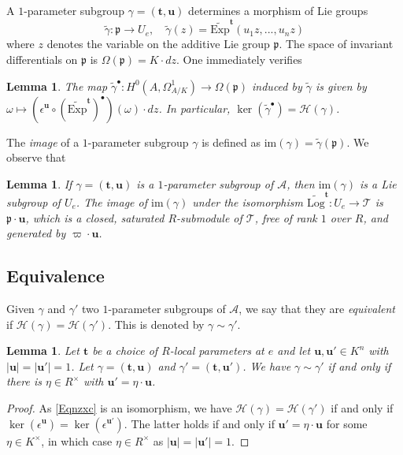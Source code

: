 \documentclass[11pt]{amsart}
\newtheorem{lemma}[theorem]{Lemma}
\theoremstyle{remark}
\numberwithin{equation}{section}
\newcommand{\pfrak}{\mathfrak{p}}
\newcommand{\Acal}{\mathscr{A}}
\newcommand{\Hcal}{\mathscr{H}}
\newcommand{\Tcal}{\mathscr{T}}
\newcommand{\ttt}{\mathbf{t}}
\newcommand{\uu}{\mathbf{u}}
\newcommand{\Exp}{\mathrm{Exp}}
\newcommand{\Log}{\mathrm{Log}}
\newcommand{\im}{\mathrm{im}}
\begin{document}
A $1$-parameter subgroup $\gamma=(\ttt,\uu)$ determines a morphism of Lie groups 
\begin{equation}\label{Eqntildegamma}
\tilde{\gamma}:\pfrak \to U_e, \quad \tilde{\gamma}(z)=\widetilde{\Exp}^\ttt(u_1z,...,u_nz)
\end{equation}
where $z$ denotes the variable on the additive Lie group $\pfrak$. The space of invariant differentials on $\pfrak$ is $\Omega(\pfrak) = K\cdot dz$. One immediately verifies
\begin{lemma}\label{LemmaHisKernel} The map $\tilde{\gamma}^\bullet : H^0(A,\Omega^1_{A/K})\to \Omega(\pfrak)$ induced by $\tilde{\gamma}$  is given by $\omega\mapsto (\epsilon^\uu\circ (\widetilde{\Exp}^\ttt)^\bullet)(\omega)\cdot dz$. In particular, $\ker(\tilde{\gamma}^\bullet)=\Hcal(\gamma)$.
\end{lemma}
The \emph{image} of a $1$-parameter subgroup $\gamma$ is defined as $\im(\gamma)=\tilde{\gamma}(\pfrak)$. We observe that
\begin{lemma}\label{LemmaSaturated} If $\gamma=(\ttt,\uu)$ is a $1$-parameter subgroup of $\Acal$, then $\im(\gamma)$ is a Lie subgroup of $U_e$. The image of $\im(\gamma)$ under the isomorphism $\widetilde{\Log}^\ttt:U_e\to \Tcal$ is $\pfrak\cdot \uu$, which is a closed, saturated $R$-submodule of $\Tcal$, free of rank $1$ over $R$, and generated by $\varpi\cdot \uu$.
\end{lemma}


\subsection{Equivalence} Given $\gamma$ and $\gamma'$ two $1$-parameter subgroups  of $\Acal$, we say that they are \emph{equivalent} if $\Hcal(\gamma)=\Hcal(\gamma')$. This is denoted by $\gamma\sim\gamma'$.

\begin{lemma} \label{LemmaVaryu1PS} Let $\ttt$ be a choice of $R$-local parameters at $e$ and let $\uu,\uu'\in K^n$ with $|\uu|=|\uu'|=1$. Let $\gamma=(\ttt,\uu)$ and $\gamma'=(\ttt,\uu')$. We have $\gamma\sim \gamma'$ if and only if there is $\eta\in R^\times$ with $\uu'=\eta\cdot \uu$.
\end{lemma}
\begin{proof} As \eqref{Eqnzxc} is an isomorphism, we have $\Hcal(\gamma)=\Hcal(\gamma')$ if and only if $\ker(\epsilon^\uu)=\ker(\epsilon^{\uu'})$. The latter holds if and only if $\uu'=\eta\cdot \uu$ for some $\eta\in K^\times$, in which case  $\eta\in R^\times$ as $|\uu|=|\uu'|=1$.
\end{proof}
\end{document}
